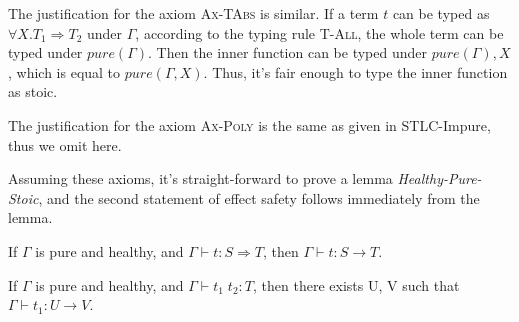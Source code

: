 The justification for the axiom \textsc{Ax-TAbs} is similar. If a term
$t$ can be typed as $\forall X.T_1 \Rightarrow T_2$ under $\Gamma$,
according to the typing rule \textsc{T-All}, the whole term can be
typed under $pure(\Gamma)$. Then the inner function can be typed under
$pure(\Gamma), X$, which is equal to $pure(\Gamma, X)$. Thus, it's
fair enough to type the inner function as stoic.

The justification for the axiom \textsc{Ax-Poly} is the same as given
in STLC-Impure, thus we omit here.

Assuming these axioms, it's straight-forward to prove a lemma
\emph{Healthy-Pure-Stoic}, and the second statement of effect safety
follows immediately from the lemma.

\begin{lemma}
  If $\Gamma$ is pure and healthy,  and $\Gamma \vdash t : S
  \Rightarrow T$, then $\Gamma \vdash t : S \to T$.
\end{lemma}

\begin{theorem}
  If $\Gamma$ is pure and healthy, and $\Gamma \vdash t_1 \; t_2 : T$,
  then there exists U, V such that $\Gamma \vdash t_1 : U \to V$.
\end{theorem}
